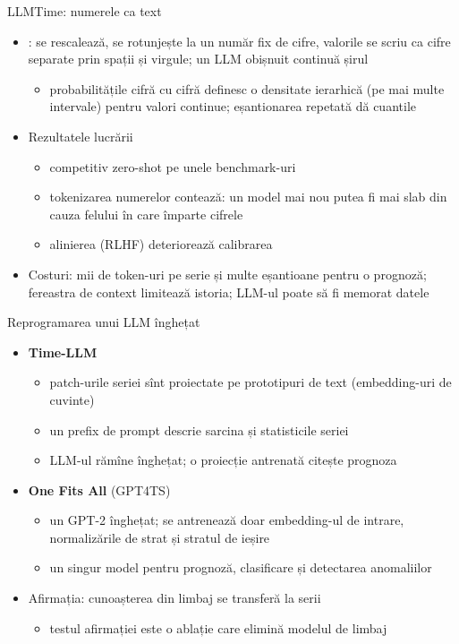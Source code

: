 \begin{frame}{LLMTime: numerele ca text}
\itemsize{\small}
\begin{itemize}
    \item {}: se rescalează, se rotunjește la un număr fix de cifre, valorile se scriu ca cifre separate prin spații și virgule; un LLM obișnuit continuă șirul
    \begin{itemize}
        \item probabilitățile cifră cu cifră definesc o densitate ierarhică (pe mai multe intervale) pentru valori continue; eșantionarea repetată dă cuantile
    \end{itemize}
    \item Rezultatele lucrării
    \begin{itemize}
        \item competitiv zero-shot pe unele benchmark-uri
        \item tokenizarea numerelor contează: un model mai nou putea fi mai slab din cauza felului în care împarte cifrele
        \item alinierea (RLHF) deteriorează calibrarea
    \end{itemize}
    \item Costuri: mii de token-uri pe serie și multe eșantioane pentru o prognoză; fereastra de context limitează istoria; LLM-ul poate să fi memorat datele
\end{itemize}
\end{frame}

\begin{frame}{Reprogramarea unui LLM înghețat}
\itemsize{\small}
\begin{itemize}
    \item \textbf{Time-LLM} 
    \begin{itemize}
        \item patch-urile seriei sînt proiectate pe prototipuri de text (embedding-uri de cuvinte)
        \item un prefix de prompt descrie sarcina și statisticile seriei
        \item LLM-ul rămîne înghețat; o proiecție antrenată citește prognoza
    \end{itemize}
    \item \textbf{One Fits All} (GPT4TS) 
    \begin{itemize}
        \item un GPT-2 înghețat; se antrenează doar embedding-ul de intrare, normalizările de strat și stratul de ieșire
        \item un singur model pentru prognoză, clasificare și detectarea anomaliilor
    \end{itemize}
    \item Afirmația: cunoașterea din limbaj se transferă la serii
    \begin{itemize}
        \item testul afirmației este o ablație care elimină modelul de limbaj
    \end{itemize}
\end{itemize}
\end{frame}

